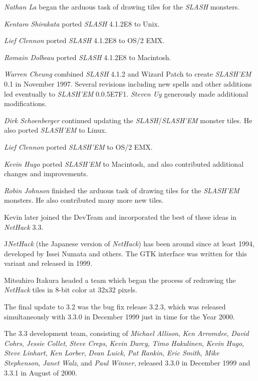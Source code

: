 {\it Nathan La\/} began the arduous task of drawing tiles for the {\it SLASH\/} monsters.

{\it Kentaro Shirakata\/} ported {\it SLASH\/} 4.1.2E8 to Unix.

{\it Lief Clennon\/} ported {\it SLASH\/} 4.1.2E8 to OS/2 EMX.

{\it Romain Dolbeau\/} ported {\it SLASH\/} 4.1.2E8 to Macintosh.

{\it Warren Cheung\/} combined {\it SLASH\/} 4.1.2 and Wizard Patch to create
{\it SLASH'EM\/} 0.1 in November 1997.  Several revisions including new spells and
other additions led eventually to {\it SLASH'EM\/} 0.0.5E7F1. {\it Steven Uy\/}
generously made additional modifications.

{\it Dirk Schoenberger\/} continued updating the {\it SLASH\/}/{\it SLASH'EM\/} monster
tiles.  He also ported {\it SLASH'EM\/} to Linux.

{\it Lief Clennon\/} ported {\it SLASH'EM\/} to OS/2 EMX.

{\it Kevin Hugo\/} ported {\it SLASH'EM\/} to Macintosh,  and also contributed
additional changes and improvements.

{\it Robin Johnson\/} finished the arduous task of drawing tiles for the
{\it SLASH'EM\/} monsters.  He also contributed many more new tiles.

Kevin later joined the
DevTeam and incorporated the best of these ideas in {\it NetHack\/} 3.3.

J{\it NetHack\/} (the Japanese version of {\it NetHack\/}) has been around since at least
1994, developed by Issei Numata and others. The GTK interface was written
for this variant and released in 1999.

Mitsuhiro Itakura headed a team which began the process of redrawing the
{\it NetHack\/} tiles in 8-bit color at 32x32 pixels.

The final update to 3.2 was the bug fix release 3.2.3, which was released
simultaneously with 3.3.0 in December 1999 just in time for the Year 2000.

The 3.3 development team, consisting of {\it Michael Allison}, {\it Ken Arromdee}, 
{\it David Cohrs}, {\it Jessie Collet}, {\it Steve Creps}, {\it Kevin Darcy}, 
{\it Timo Hakulinen}, {\it Kevin Hugo}, {\it Steve Linhart}, {\it Ken Lorber}, 
{\it Dean Luick}, {\it Pat Rankin}, {\it Eric Smith}, {\it Mike Stephenson}, 
{\it Janet Walz}, and {\it Paul Winner}, released 3.3.0 in 
December 1999 and 3.3.1 in August of 2000.


